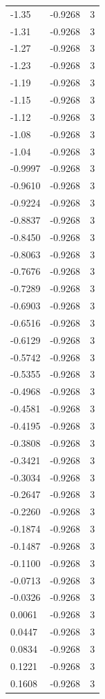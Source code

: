 \begin{longtable}{lrr}
  -1.35 & -0.9268 & 3 \\
  -1.31 & -0.9268 & 3 \\
  -1.27 & -0.9268 & 3 \\
  -1.23 & -0.9268 & 3 \\
  -1.19 & -0.9268 & 3 \\
  -1.15 & -0.9268 & 3 \\
  -1.12 & -0.9268 & 3 \\
  -1.08 & -0.9268 & 3 \\
  -1.04 & -0.9268 & 3 \\
  -0.9997 & -0.9268 & 3 \\
  -0.9610 & -0.9268 & 3 \\
  -0.9224 & -0.9268 & 3 \\
  -0.8837 & -0.9268 & 3 \\
  -0.8450 & -0.9268 & 3 \\
  -0.8063 & -0.9268 & 3 \\
  -0.7676 & -0.9268 & 3 \\
  -0.7289 & -0.9268 & 3 \\
  -0.6903 & -0.9268 & 3 \\
  -0.6516 & -0.9268 & 3 \\
  -0.6129 & -0.9268 & 3 \\
  -0.5742 & -0.9268 & 3 \\
  -0.5355 & -0.9268 & 3 \\
  -0.4968 & -0.9268 & 3 \\
  -0.4581 & -0.9268 & 3 \\
  -0.4195 & -0.9268 & 3 \\
  -0.3808 & -0.9268 & 3 \\
  -0.3421 & -0.9268 & 3 \\
  -0.3034 & -0.9268 & 3 \\
  -0.2647 & -0.9268 & 3 \\
  -0.2260 & -0.9268 & 3 \\
  -0.1874 & -0.9268 & 3 \\
  -0.1487 & -0.9268 & 3 \\
  -0.1100 & -0.9268 & 3 \\
  -0.0713 & -0.9268 & 3 \\
  -0.0326 & -0.9268 & 3 \\
  0.0061 & -0.9268 & 3 \\
  0.0447 & -0.9268 & 3 \\
  0.0834 & -0.9268 & 3 \\
  0.1221 & -0.9268 & 3 \\
  0.1608 & -0.9268 & 3 \\

\end{longtable}
